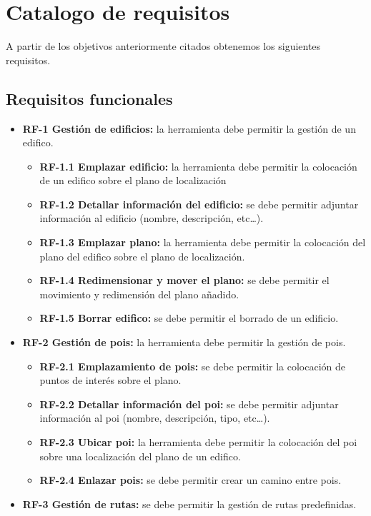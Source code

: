 \section{Catalogo de requisitos}
A partir de los objetivos anteriormente citados obtenemos los siguientes requisitos.

\subsection{Requisitos funcionales}

\begin{itemize}
\item
\textbf{RF-1 Gestión de edificios:} la herramienta debe permitir la gestión de un edifico.
\begin{itemize}
	\item
	\textbf{RF-1.1 Emplazar edificio:} la herramienta debe permitir la colocación de un edifico sobre el plano de localización
	\item
	\textbf{RF-1.2 Detallar información del edificio:} se debe permitir adjuntar información al edificio (nombre, descripción, etc\ldots).
	\item
	\textbf{RF-1.3 Emplazar plano:} la herramienta debe permitir la colocación del plano del edifico sobre el plano de localización.
	\item
	\textbf{RF-1.4 Redimensionar y mover el plano:} se debe permitir el movimiento y redimensión del plano añadido.
	\item
	\textbf{RF-1.5 Borrar edifico:} se debe permitir el borrado de un edificio.
\end{itemize}
\item
\textbf{RF-2 Gestión de pois:} la herramienta debe permitir la gestión de pois.
\begin{itemize}
	\item
	\textbf{RF-2.1 Emplazamiento de pois:} se debe permitir la colocación de puntos de interés sobre el plano.
	\item
	\textbf{RF-2.2 Detallar información del poi:} se debe permitir adjuntar información al poi (nombre, descripción, tipo, etc\ldots).
	\item
	\textbf{RF-2.3 Ubicar poi:} la herramienta debe permitir la colocación del poi sobre una localización del plano de un edifico.
	\item
	\textbf{RF-2.4 Enlazar pois:} se debe permitir crear un camino entre pois.
\end{itemize}
\item
\textbf{RF-3 Gestión de rutas:} se debe permitir la gestión de rutas predefinidas.

\end{itemize}
